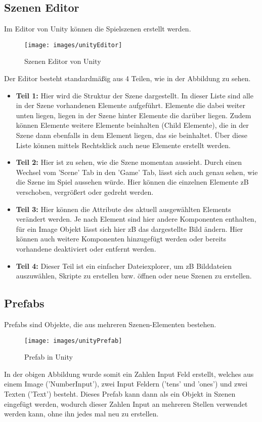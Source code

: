 \subsection{Szenen Editor}
\label{sub:szenenEditor}
Im Editor von Unity können die Spielszenen erstellt werden.
\begin{figure}[htbp]
  \centering
  \texttt{[image: images/unityEditor]}
  \caption{Szenen Editor von Unity}
  \label{fig:unityEditor}
\end{figure}
Der Editor besteht standardmäßig aus 4 Teilen, wie in der Abbildung zu sehen.
\begin{itemize}
	\item \textbf{Teil 1:} Hier wird die Struktur der Szene dargestellt. In dieser Liste sind alle in der Szene vorhandenen Elemente aufgeführt. Elemente die dabei weiter unten liegen, liegen in der Szene hinter Elemente die darüber liegen. Zudem können Elemente weitere Elemente beinhalten (Child Elemente), die in der Szene dann ebenfalls in dem Element liegen, das sie beinhaltet. Über diese Liste können mittels Rechtsklick auch neue Elemente erstellt werden.
	\item \textbf{Teil 2:} Hier ist zu sehen, wie die Szene momentan aussieht. Durch einen Wechsel vom 'Scene' Tab in den 'Game' Tab, lässt sich auch genau sehen, wie die Szene im Spiel aussehen würde. Hier können die einzelnen Elemente zB verschoben, vergrößert oder gedreht werden.
	\item \textbf{Teil 3:} Hier können die Attribute des aktuell ausgewählten Elements verändert werden. Je nach Element sind hier andere Komponenten enthalten, für ein Image Objekt lässt sich hier zB das dargestellte Bild ändern. Hier können auch weitere Komponenten hinzugefügt werden oder bereits vorhandene deaktiviert oder entfernt werden.
	\item \textbf{Teil 4:} Dieser Teil ist ein einfacher Dateiexplorer, um zB Bilddateien auszuwählen, Skripte zu erstellen bzw. öffnen oder neue Szenen zu erstellen.
\end{itemize}

\subsection{Prefabs}
\label{sub:prefab}
Prefabs sind Objekte, die aus mehreren Szenen-Elementen bestehen.
\begin{figure}[htbp]
  \centering
  \texttt{[image: images/unityPrefab]}
  \caption{Prefab in Unity}
  \label{fig:unityPrefab}
\end{figure}
In der obigen Abbildung wurde somit ein Zahlen Input Feld erstellt, welches aus einem Image ('NumberInput'), zwei Input Feldern ('tens' und 'ones') und zwei Texten ('Text') besteht. Dieses Prefab kann dann als ein Objekt in Szenen eingefügt werden, wodurch dieser Zahlen Input an mehreren Stellen verwendet werden kann, ohne ihn jedes mal neu zu erstellen.

